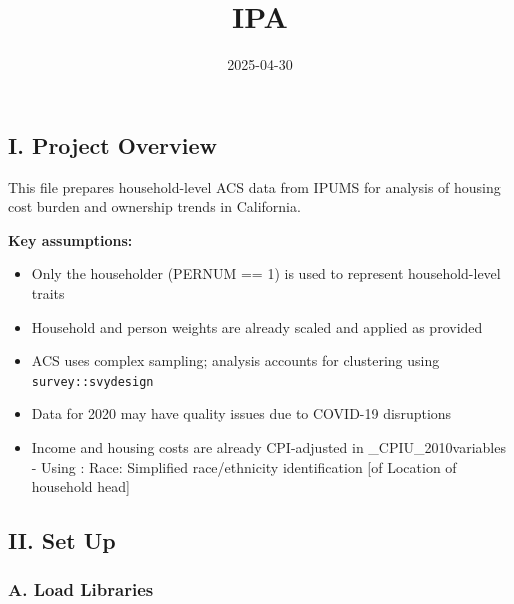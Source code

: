 \documentclass[
]{article}
\title{IPA}
\author{}
\date{\vspace{-2.5em}2025-04-30}
\providecommand{\tightlist}{%
  \setlength{\itemsep}{0pt}\setlength{\parskip}{0pt}}
\begin{document}
\maketitle

\subsection{I. Project Overview}\label{i.-project-overview}

This file prepares household-level ACS data from IPUMS for analysis of
housing cost burden and ownership trends in California.

\textbf{Key assumptions:}

\begin{itemize}
\tightlist
\item
  Only the householder (PERNUM == 1) is used to represent
  household-level traits
\item
  Household and person weights are already scaled and applied as
  provided
\item
  ACS uses complex sampling; analysis accounts for clustering using
  \texttt{survey::svydesign}
\item
  Data for 2020 may have quality issues due to COVID-19 disruptions
\item
  Income and housing costs are already CPI-adjusted in
  \_CPIU\_2010variables - Using : Race: Simplified race/ethnicity
  identification {[}of Location of household head{]}
\end{itemize}

\subsection{II. Set Up}\label{ii.-set-up}

\subsubsection{A. Load Libraries}\label{a.-load-libraries}
\end{document}
